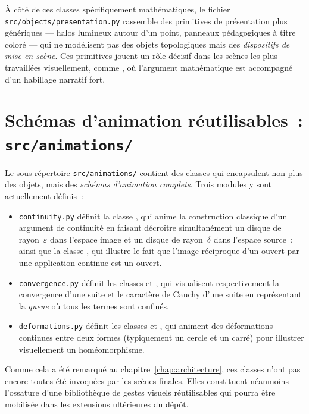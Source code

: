 \documentclass[12pt, a4paper, openany]{report}
\begin{document}
	À côté de ces classes spécifiquement mathématiques, le fichier \texttt{src/objects/presentation.py} rassemble des primitives de présentation plus génériques — halos lumineux autour d’un point, panneaux pédagogiques à titre coloré — qui ne modélisent pas des objets topologiques mais des \emph{dispositifs de mise en scène}. Ces primitives jouent un rôle décisif dans les scènes les plus travaillées visuellement, comme , où l’argument mathématique est accompagné d’un habillage narratif fort.

	\section{Schémas d’animation réutilisables~: \texttt{src/animations/}}

	Le sous-répertoire \texttt{src/animations/} contient des classes qui encapsulent non plus des objets, mais des \emph{schémas d’animation complets}. Trois modules y sont actuellement définis~:

	\begin{itemize}
		\item \texttt{continuity.py} définit la classe , qui anime la construction classique d’un argument de continuité en faisant décroître simultanément un disque de rayon~$\varepsilon$ dans l’espace image et un disque de rayon~$\delta$ dans l’espace source~; ainsi que la classe , qui illustre le fait que l’image réciproque d’un ouvert par une application continue est un ouvert.
		\item \texttt{convergence.py} définit les classes  et , qui visualisent respectivement la convergence d’une suite et le caractère de Cauchy d’une suite en représentant la \emph{queue} où tous les termes sont confinés.
		\item \texttt{deformations.py} définit les classes  et , qui animent des déformations continues entre deux formes (typiquement un cercle et un carré) pour illustrer visuellement un homéomorphisme.
	\end{itemize}

	Comme cela a été remarqué au chapitre~\ref{chap:architecture}, ces classes n’ont pas encore toutes été invoquées par les scènes finales. Elles constituent néanmoins l’ossature d’une bibliothèque de gestes visuels réutilisables qui pourra être mobilisée dans les extensions ultérieures du dépôt.
\end{document}

